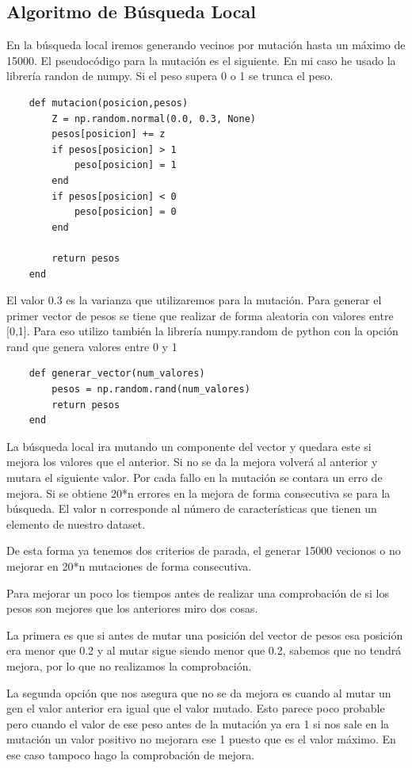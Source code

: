 \documentclass[titlepage]{article}
\begin{document}
	\subsection{Algoritmo de Búsqueda Local}
	En la búsqueda local iremos generando vecinos por mutación hasta un máximo de 15000.
	El pseudocódigo para la mutación es el siguiente. En mi caso he usado la librería randon de numpy. Si el peso supera 0 o 1 se trunca el peso.
	
	\begin{lstlisting}
	def mutacion(posicion,pesos)
		Z = np.random.normal(0.0, 0.3, None)
		pesos[posicion] += z
		if pesos[posicion] > 1 
			peso[posicion] = 1
		end 
		if pesos[posicion] < 0
			peso[posicion] = 0
		end 
			
		return pesos
	end
	\end{lstlisting}
	
	El valor 0.3 es la varianza que utilizaremos para la mutación.
	Para generar el primer vector de pesos se tiene que realizar de forma aleatoria con valores entre [0,1]. Para eso utilizo también la librería numpy.random de python con la opción rand que genera valores entre 0 y 1
	
	\begin{lstlisting}
	def generar_vector(num_valores)
		pesos = np.random.rand(num_valores)
		return pesos
	end
	\end{lstlisting}
	
	La búsqueda local ira mutando un componente del vector y quedara este si mejora los valores que el anterior. Si no se da la mejora volverá al anterior y mutara el siguiente valor. Por cada fallo en la mutación se contara un erro de mejora. Si se obtiene 20*n errores en la mejora de forma consecutiva se para la búsqueda. El valor n corresponde al número de características que tienen un elemento de nuestro dataset.
	
	De esta forma ya tenemos dos criterios de parada, el generar 15000 vecionos o no mejorar en 20*n mutaciones de forma consecutiva.
	
	Para mejorar un poco los tiempos antes de realizar una comprobación de si los pesos son mejores que los anteriores miro dos cosas.
	
	La primera es que si antes de mutar una posición del vector de pesos esa posición era menor que 0.2 y al mutar sigue siendo menor que 0.2, sabemos que no tendrá mejora, por lo que no realizamos la comprobación.
	
	La segunda opción que nos asegura que no se da mejora es cuando al mutar un gen el valor anterior era igual que el valor mutado. Esto parece poco probable pero cuando el valor de ese peso antes de la mutación ya era 1 si nos sale en la mutación un valor positivo no mejorara ese 1 puesto que es el valor máximo. En ese caso tampoco hago la comprobación de mejora.
	
\end{document}
